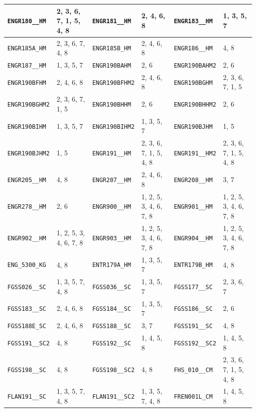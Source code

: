 \begin{longtable}{|l|l||l|l||l|l|}
    \verb|ENGR180__HM| & 2, 3, 6, 7, 1, 5, 4, 8 & \verb|ENGR181__HM| & 2, 4, 6, 8 & \verb|ENGR183__HM| & 1, 3, 5, 7\\\hline
    \verb|ENGR185A_HM| & 2, 3, 6, 7, 4, 8 & \verb|ENGR185B_HM| & 2, 4, 6, 8 & \verb|ENGR186__HM| & 4, 8\\\hline
    \verb|ENGR187__HM| & 1, 3, 5, 7 & \verb|ENGR190BAHM| & 2, 6 & \verb|ENGR190BAHM2| & 2, 6\\\hline
    \verb|ENGR190BFHM| & 2, 4, 6, 8 & \verb|ENGR190BFHM2| & 2, 4, 6, 8 & \verb|ENGR190BGHM| & 2, 3, 6, 7, 1, 5\\\hline
    \verb|ENGR190BGHM2| & 2, 3, 6, 7, 1, 5 & \verb|ENGR190BHHM| & 2, 6 & \verb|ENGR190BHHM2| & 2, 6\\\hline
    \verb|ENGR190BIHM| & 1, 3, 5, 7 & \verb|ENGR190BIHM2| & 1, 3, 5, 7 & \verb|ENGR190BJHM| & 1, 5\\\hline
    \verb|ENGR190BJHM2| & 1, 5 & \verb|ENGR191__HM| & 2, 3, 6, 7, 1, 5, 4, 8 & \verb|ENGR191__HM2| & 2, 3, 6, 7, 1, 5, 4, 8\\\hline
    \verb|ENGR205__HM| & 4, 8 & \verb|ENGR207__HM| & 2, 4, 6, 8 & \verb|ENGR208__HM| & 3, 7\\\hline
    \verb|ENGR278__HM| & 2, 6 & \verb|ENGR900__HM| & 1, 2, 5, 3, 4, 6, 7, 8 & \verb|ENGR901__HM| & 1, 2, 5, 3, 4, 6, 7, 8\\\hline
    \verb|ENGR902__HM| & 1, 2, 5, 3, 4, 6, 7, 8 & \verb|ENGR903__HM| & 1, 2, 5, 3, 4, 6, 7, 8 & \verb|ENGR904__HM| & 1, 2, 5, 3, 4, 6, 7, 8\\\hline
    \verb|ENG_5300_KG| & 4, 8 & \verb|ENTR179A_HM| & 1, 3, 5, 7 & \verb|ENTR179B_HM| & 4, 8\\\hline
    \verb|FGSS026__SC| & 1, 3, 5, 7, 4, 8 & \verb|FGSS036__SC| & 1, 3, 5, 7 & \verb|FGSS177__SC| & 2, 3, 6, 7\\\hline
    \verb|FGSS183__SC| & 2, 4, 6, 8 & \verb|FGSS184__SC| & 1, 3, 5, 7 & \verb|FGSS186__SC| & 2, 6\\\hline
    \verb|FGSS188E_SC| & 2, 4, 6, 8 & \verb|FGSS188__SC| & 3, 7 & \verb|FGSS191__SC| & 4, 8\\\hline
    \verb|FGSS191__SC2| & 4, 8 & \verb|FGSS192__SC| & 1, 4, 5, 8 & \verb|FGSS192__SC2| & 1, 4, 5, 8\\\hline
    \verb|FGSS198__SC| & 4, 8 & \verb|FGSS198__SC2| & 4, 8 & \verb|FHS_010__CM| & 2, 3, 6, 7, 1, 5, 4, 8\\\hline
    \verb|FLAN191__SC| & 1, 3, 5, 7, 4, 8 & \verb|FLAN191__SC2| & 1, 3, 5, 7, 4, 8 & \verb|FREN001L_CM| & 1, 4, 5, 8\\\hline

\end{longtable}
